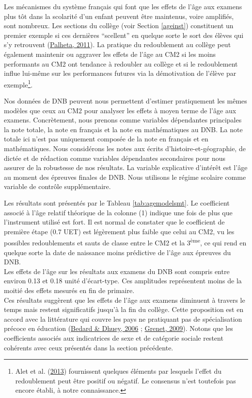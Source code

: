 \documentclass[
]{book}
\begin{document}
\quad Les mécanismes du système français qui font que les effets de l'âge aux examens plus tôt dans la scolarité d'un enfant peuvent être maintenus, voire amplifiés, sont nombreux. Les sections du collège (voir Section \ref{ageinst}) constituent un premier exemple si ces dernières ``scellent'' en quelque sorte le sort des élèves qui s'y retrouvent (\protect\hyperlink{ref-PAL:11}{Palheta, 2011}). La pratique du redoublement au collège peut également maintenir ou aggraver les effets de l'âge au CM2 si les moins performants au CM2 ont tendance à redoubler au collège et si le redoublement influe lui-même sur les performances futures via la démotivation de l'élève par exemple\footnote{Alet et al. (\protect\hyperlink{ref-ALE:eal:13}{2013}) fournissent quelques éléments par lesquels l'effet du redoublement peut être positif ou négatif. Le consensus n'est toutefois pas encore établi, à notre connaissance.}.

\quad Nos données de DNB peuvent nous permettent d'estimer pratiquement les mêmes modèles que ceux au CM2 pour analyser les effets à moyen terme de l'âge aux examens. Concrètement, nous prenons comme variables dépendantes principales la note totale, la note en français et la note en mathématiques au DNB. La note totale ici n'est pas uniquement composée de la note en français et en mathématiques. Nous considérons les notes aux écrits d'histoire-et-géographie, de dictée et de rédaction comme variables dépendantes secondaires pour nous assurer de la robustesse de nos résultats. La variable explicative d'intérêt est l'âge au moment des épreuves finales de DNB. Nous utilisons le régime scolaire comme variable de contrôle supplémentaire.

Les résultats sont présentés par le Tableau \ref{tab:agemodelsmt}. Le coefficient associé à l'âge relatif théorique de la colonne (1) indique une fois de plus que l'instrument utilisé est fort. Il est normal de constater que le coefficient de première étape (0.7 UET) est légèrement plus faible que celui au CM2, vu les possibles redoublements et sauts de classe entre le CM2 et la 3\textsuperscript{ème}, ce qui rend en quelque sorte la date de naissance moins prédictive de l'âge aux épreuves du DNB.\\
Les effets de l'âge sur les résultats aux examens du DNB sont compris entre environ 0.13 et 0.18 unité d'écart-type. Ces amplitudes représentent moins de la moitié des effets mesurés en fin de primaire.\\
Ces résultats suggèrent que les effets de l'âge aux examens diminuent à travers le temps mais restent significatifs jusqu'à la fin du collège. Cette proposition est en accord avec la littérature qui couvre les pays ne pratiquant pas de spécialisation précoce en éducation (\protect\hyperlink{ref-BED:DHU:06}{Bedard \& Dhuey, 2006} ; \protect\hyperlink{ref-GRE:09}{Grenet, 2009}).
Notons que les coefficients associés aux indicatrices de sexe et de catégorie sociale restent cohérents avec ceux présentés dans la section précédente.
\end{document}
